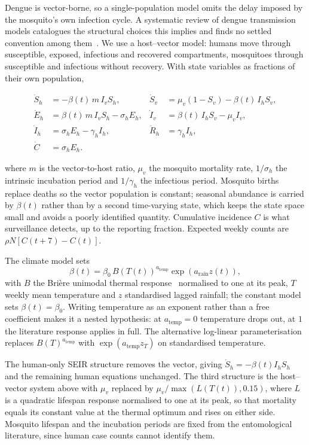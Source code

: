 \documentclass[11pt,a4paper]{article}
\begin{document}
Dengue is vector-borne, so a single-population model omits the delay imposed by
the mosquito's own infection cycle. A systematic review of dengue transmission
models catalogues the structural choices this implies and finds no settled
convention among them~\cite{andraud}. We use a host--vector model: humans move
through susceptible, exposed, infectious and recovered compartments, mosquitoes
through susceptible and infectious without recovery. With state variables as
fractions of their own population,

\begin{align*}
\dot S_h &= -\beta(t)\, m\, I_v S_h,
&\dot S_v &= \mu_v (1 - S_v) - \beta(t)\, I_h S_v,\\
\dot E_h &= \beta(t)\, m\, I_v S_h - \sigma_h E_h,
&\dot I_v &= \beta(t)\, I_h S_v - \mu_v I_v,\\
\dot I_h &= \sigma_h E_h - \gamma_h I_h,
&\dot R_h &= \gamma_h I_h,\\
\dot C &= \sigma_h E_h. &&
\end{align*}

where $m$ is the vector-to-host ratio, $\mu_v$ the mosquito mortality rate,
$1/\sigma_h$ the intrinsic incubation period and $1/\gamma_h$ the infectious
period. Mosquito births replace deaths so the vector population is constant;
seasonal abundance is carried by $\beta(t)$ rather than by a second time-varying
state, which keeps the state space small and avoids a poorly identified quantity.
Cumulative incidence $C$ is what surveillance detects, up to the reporting
fraction. Expected weekly counts are $\rho N \left[C(t + 7) - C(t)\right]$.

The climate model sets
\[
\beta(t) = \beta_0 \, B\!\left(T(t)\right)^{a_{\mathrm{temp}}}
\exp\!\left(a_{\mathrm{rain}} z(t)\right),
\]
with $B$ the Brière unimodal thermal response~\cite{briere1999} normalised to one
at its peak, $T$ weekly mean temperature and $z$ standardised lagged rainfall; the constant model sets
$\beta(t) = \beta_0$. Writing temperature as an exponent rather than a free
coefficient makes it a nested hypothesis: at $a_{\mathrm{temp}} = 0$ temperature
drops out, at $1$ the literature response applies in full. The alternative
log-linear parameterisation replaces $B(T)^{a_{\mathrm{temp}}}$ with
$\exp(a_{\mathrm{temp}} z_T)$ on standardised temperature.

The human-only SEIR structure removes the vector, giving
$\dot S_h = -\beta(t) I_h S_h$ and the remaining human equations unchanged. The
third structure is the host--vector system above with $\mu_v$ replaced by
$\mu_v / \max\!\left(L(T(t)), 0.15\right)$, where $L$ is a quadratic lifespan
response normalised to one at its peak, so that mortality equals its constant
value at the thermal optimum and rises on either side. Mosquito lifespan and the
incubation periods are fixed from the entomological literature, since human case
counts cannot identify them.
\end{document}
